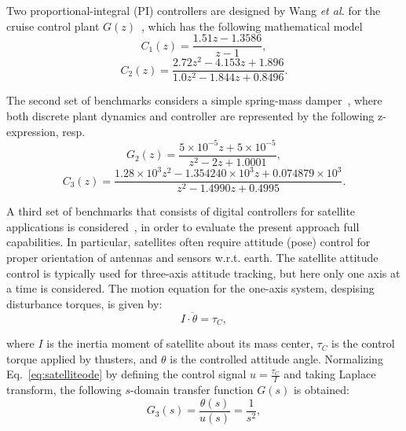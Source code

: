 \documentclass{sig-alternate-05-2015}
\begin{document}
Two proportional-integral (PI) controllers are designed by Wang {\it et al.} 
for the cruise control plant $G(z)$~\cite{DBLP:conf/hybrid/WangGRJF16}, 
which has the following mathematical model
%
\begin{equation}
\label{cruise-control-g1}
C_{1}(z)=\frac{1.51z-1.3586}{z-1}, \nonumber
\end{equation} 
%
\begin{equation}
\label{cruise-control-g2}
C_{2}(z)=\frac{2.72z^2 - 4.153z + 1.896}{1.0z^2 - 1.844z + 0.8496}. \nonumber
\end{equation} 

The second set of benchmarks considers a simple spring-mass 
damper~\cite{DBLP:conf/hybrid/WangGRJF16}, where both discrete 
plant dynamics and controller are represented by the following 
z-expression, resp.
%
\begin{equation}
\label{spring-mass-damper-g}
G_2(z)=\frac{5\times{10^{-5}}z + 5\times{10^{-5}}}{z^2 - 2z + 1.0001}, \nonumber
\end{equation} 
%
\begin{equation}
\label{spring-mass-damper-c}
C_3(z)=\frac{1.28\times{10^{3}}z^2 - 1.354240\times{10^{3}}z + 0.074879\times{10^{3}}}{z^2 - 1.4990z + 0.4995}. \nonumber
\end{equation} 

A third set of benchmarks that consists of digital controllers for satellite
applications is considered~\cite{Franklin15}, in order to evaluate the
present approach full capabilities.  In particular, satellites often require
attitude (pose) control for proper orientation of antennas and sensors
w.r.t.  earth.  The satellite attitude control is typically used for
three-axis attitude tracking, but here only one axis at a time is
considered.  The motion equation for the one-axis system, despising
disturbance torques, is given by:
%
\begin{equation}
\label{eq:satelliteode}
I\cdot \ddot{\theta} = \tau_{C},
\end{equation}

\noindent where $I$ is the inertia moment of satellite about its mass center, $\tau_{C}$ is the control 
torque applied by thusters, and $\theta$ is the controlled attitude angle. 
Normalizing Eq.~\eqref{eq:satelliteode} by defining the control signal $u=\frac{\tau_{C}}{I}$ and 
taking Laplace transform, the following $s$-domain transfer function $G(s)$ is obtained:
%
\begin{equation}
\label{eq:satellitetf}
G_{3}(s)=\frac{\theta(s)}{u(s)}=\frac{1}{s^2},
\end{equation}
\end{document}
